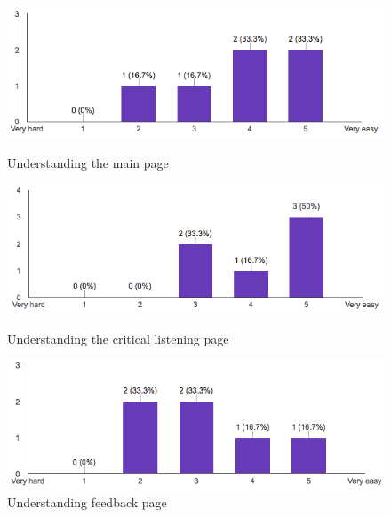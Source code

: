 \begin{figure}[!ht]
	\centering
	\begin{minipage}{.5\textwidth}
		\centering
		\includegraphics[scale=0.5]{Figures/responses/understanding_main.png}
		\caption{Understanding the main page}
		\label{fig:int_improving_lang}
	\end{minipage}%
	\begin{minipage}{.5\textwidth}
		\centering
		\includegraphics[scale=0.5]{Figures/responses/understanding_listening.png}
		\caption{Understanding the critical listening page}
		\label{fig:int_learnign_lang}
	\end{minipage}
	\begin{minipage}{.5\textwidth}
		\centering
		\includegraphics[scale=0.5]{Figures/responses/understanding_feedback.png}
		\caption{Understanding feedback page}
		\label{fig:int_usage_smartphone}
	\end{minipage}%
\end{figure}

